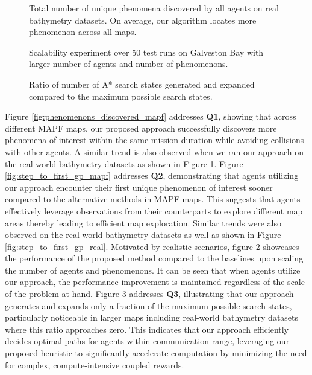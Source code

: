 \documentclass[letterpaper, 10 pt, conference]{IEEEConference}
\begin{document}
\begin{figure}[h]
    \centering  
    
    \caption{Total number of unique phenomena discovered by all agents on real bathymetry datasets. On average, our algorithm locates more phenomenon across all maps.}
    \label{fig:phenomenons_discovered_real}
\end{figure}

\begin{figure}[h]
    \centering
    \scalebox{1}{
        
    }
    \caption{Scalability experiment over 50 test runs on Galveston Bay with larger number of agents and number of phenomenons.}
    \label{fig:scalability}
\end{figure}

\begin{figure}[h]
    \centering
    \scalebox{1}{
        
    }
    \caption{Ratio of number of A* search states generated and expanded compared to the maximum possible search states.}
    \label{fig:ratio_to_max}
\end{figure}

Figure \ref{fig:phenomenons_discovered_mapf} addresses \textbf{Q1}, showing that across different MAPF maps, our proposed approach successfully discovers more phenomena of interest within the same mission duration while avoiding collisions with other agents. A similar trend is also observed when we ran our approach on the real-world bathymetry datasets as shown in Figure \ref{fig:phenomenons_discovered_real}. Figure \ref{fig:step_to_first_gp_mapf} addresses \textbf{Q2}, demonstrating that agents utilizing our approach encounter their first unique phenomenon of interest sooner compared to the alternative methods in MAPF maps. This suggests that agents effectively leverage observations from their counterparts to explore different map areas thereby leading to efficient map exploration. Similar trends were also observed on the real-world bathymetry datasets as well as shown in Figure \ref{fig:step_to_first_gp_real}. Motivated by realistic scenarios, figure \ref{fig:scalability} showcases the performance of the proposed method compared to the baselines upon scaling the number of agents and phenomenons. It can be seen that when agents utilize our approach, the performance improvement is maintained regardless of the scale of the problem at hand. Figure \ref{fig:ratio_to_max} addresses \textbf{Q3}, illustrating that our approach generates and expands only a fraction of the maximum possible search states, particularly noticeable in larger maps including real-world bathymetry datasets where this ratio approaches zero. This indicates that our approach efficiently decides optimal paths for agents within communication range, leveraging our proposed heuristic to significantly accelerate computation by minimizing the need for complex, compute-intensive coupled rewards. 
\end{document}
